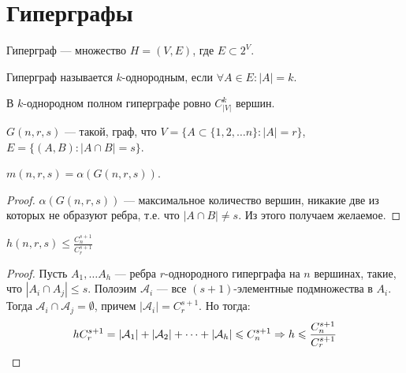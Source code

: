 

\section{Гиперграфы}

\begin{definition}
    Гиперграф --- множество \(H = (V, E)\), где \(E \subset 2^V\).
\end{definition}

\begin{definition}
    Гиперграф называется \(k\)-однородным, если \(\forall A \in E: |A| = k\).
\end{definition}

\begin{note}
    В \(k\)-однородном полном гиперграфе ровно \(C_{|V|}^k\) вершин.
\end{note}




\begin{reminder}
    \(G(n, r, s)\) --- такой, граф, что \(V = \{A \subset \{1, 2, \dots n\}: |A| = r\}\), \(E = \{(A, B) : |A \cap B| = s\}\).
\end{reminder}
\begin{note}
    \(m(n, r, s) = \alpha(G(n, r, s))\).
\end{note}
\begin{proof}
    \(\alpha(G(n, r, s))\) --- максимальное количество вершин, никакие две из которых не образуют ребра, т.е. что \(|A \cap B| \ne s\). Из этого получаем желаемое.
\end{proof}

\begin{proposition}
    \(h(n, r, s) \le \frac{C_n^{s + 1}}{C_r^{s + 1}}\)
\end{proposition}
\begin{proof}
    Пусть \(A_1, \dots A_h\) --- ребра \(r\)-однородного гиперграфа на \(n\) вершинах, такие, что \(|A_i \cap A_j| \le s\). Полоэим \(\mathcal{A}_i\) --- все \((s + 1)\)-элементные подмножества в \(A_i\). Тогда \(\mathcal{A}_i \cap \mathcal{A}_j = \emptyset\), причем \(|\mathcal{A}_i| = C_r^{s + 1}\). Но тогда:
    \[hC_r^{s + 1} = |\mathcal{A}_1| + |\mathcal{A}_2| + \dots + |\mathcal{A}_h| \leqslant C_n^{s + 1} \Rightarrow h \leqslant \frac{C_n^{s + 1}}{C_r^{s + 1}}\]
\end{proof}

